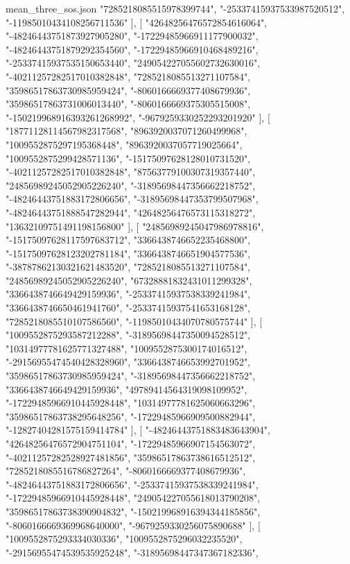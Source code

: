\begin{filecontents*}[overwrite]{mean_three_sos.json}
    "7285218085515978399744",
    "-25337415937533987520512",
    "-11985010434108256711536"
   ],
   [
    "42648256476572854616064",
    "-48246443751873927905280",
    "-17229485966911177900032",
    "-48246443751879292354560",
    "-17229485966910468489216",
    "-25337415937535150653440",
    "249054227055602732630016",
    "-40211257282517010382848",
    "7285218085513271107584",
    "35986517863730985959424",
    "-8060166669377408679936",
    "35986517863731006013440",
    "-8060166669375305515008",
    "-150219968916393261268992",
    "-9679259330252293201920"
   ],
   [
    "18771128114567982317568",
    "8963920037071260499968",
    "1009552875297195368448",
    "8963920037057719025664",
    "1009552875299428571136",
    "-15175097628128010731520",
    "-40211257282517010382848",
    "87563779100307319357440",
    "24856989245052905226240",
    "-31895698447356662218752",
    "-48246443751883172806656",
    "-31895698447353799507968",
    "-48246443751888547282944",
    "42648256476573115318272",
    "13632109751491198156800"
   ],
   [
    "24856989245047986978816",
    "-15175097628117597683712",
    "3366438746652235468800",
    "-15175097628123202781184",
    "3366438746651904577536",
    "-38787862130321621483520",
    "7285218085513271107584",
    "24856989245052905226240",
    "67328881832431011299328",
    "3366438746649429159936",
    "-25337415937538339241984",
    "3366438746650461941760",
    "-25337415937541653168128",
    "7285218085510107586560",
    "-11985010434070780575744"
   ],
   [
    "1009552875293587212288",
    "-31895698447350094528512",
    "10314977781625771327488",
    "1009552875300174016512",
    "-29156955474540428328960",
    "3366438746653992701952",
    "35986517863730985959424",
    "-31895698447356662218752",
    "3366438746649429159936",
    "49789414564319098109952",
    "-17229485966910445928448",
    "10314977781625060663296",
    "35986517863738295648256",
    "-17229485966909500882944",
    "-12827404281575159414784"
   ],
   [
    "-48246443751883483643904",
    "42648256476572904751104",
    "-17229485966907154563072",
    "-40211257282528927481856",
    "35986517863738616512512",
    "7285218085516786827264",
    "-8060166669377408679936",
    "-48246443751883172806656",
    "-25337415937538339241984",
    "-17229485966910445928448",
    "249054227055618013790208",
    "35986517863738390904832",
    "-150219968916394344185856",
    "-8060166669369968640000",
    "-9679259330256075890688"
   ],
   [
    "1009552875293334030336",
    "1009552875296032235520",
    "-29156955474539535925248",
    "-31895698447347367182336",

\end{filecontents*}
